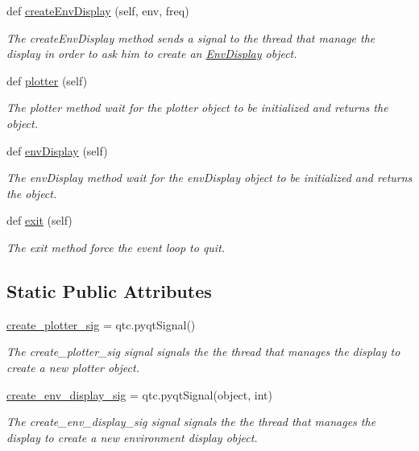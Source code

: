 \begin{DoxyCompactItemize}
def \hyperlink{classDQN-Deepmind-NIPS-2013_1_1QtDisplay_1_1QDisplay_af84de3d09bc8fc27f09f5e6a3c4775a1}{create\+Env\+Display} (self, env, freq)
\begin{DoxyCompactList}\small\item\em The create\+Env\+Display method sends a signal to the thread that manage the display in order to ask him to create an \hyperlink{namespaceDQN-Deepmind-NIPS-2013_1_1EnvDisplay}{Env\+Display} object. \end{DoxyCompactList}\item 
def \hyperlink{classDQN-Deepmind-NIPS-2013_1_1QtDisplay_1_1QDisplay_aa399a47324e5e725fd5f5fd393e997ef}{plotter} (self)
\begin{DoxyCompactList}\small\item\em The plotter method wait for the plotter object to be initialized and returns the object. \end{DoxyCompactList}\item 
def \hyperlink{classDQN-Deepmind-NIPS-2013_1_1QtDisplay_1_1QDisplay_a50d2c693245a9a3f617ed2295e4d87f3}{env\+Display} (self)
\begin{DoxyCompactList}\small\item\em The env\+Display method wait for the env\+Display object to be initialized and returns the object. \end{DoxyCompactList}\item 
def \hyperlink{classDQN-Deepmind-NIPS-2013_1_1QtDisplay_1_1QDisplay_ac4d39e4b6aff27f85280f53878adee37}{exit} (self)
\begin{DoxyCompactList}\small\item\em The exit method force the event loop to quit. \end{DoxyCompactList}\end{DoxyCompactItemize}
\subsection*{Static Public Attributes}
\begin{DoxyCompactItemize}
\item 
\hyperlink{classDQN-Deepmind-NIPS-2013_1_1QtDisplay_1_1QDisplay_a9fce093a7c41ba05405ccdea20f542ad}{create\+\_\+plotter\+\_\+sig} = qtc.\+pyqt\+Signal()
\begin{DoxyCompactList}\small\item\em The create\+\_\+plotter\+\_\+sig signal signals the the thread that manages the display to create a new plotter object. \end{DoxyCompactList}\item 
\hyperlink{classDQN-Deepmind-NIPS-2013_1_1QtDisplay_1_1QDisplay_adf7d2844b0fc2026a3d4c2ed3d1218b9}{create\+\_\+env\+\_\+display\+\_\+sig} = qtc.\+pyqt\+Signal(object, int)
\begin{DoxyCompactList}\small\item\em The create\+\_\+env\+\_\+display\+\_\+sig signal signals the the thread that manages the display to create a new environment display object. \end{DoxyCompactList}\end{DoxyCompactItemize}


